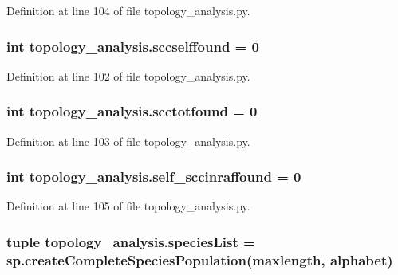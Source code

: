 Definition at line 104 of file topology\-\_\-analysis.\-py.

\hypertarget{a00128_aeacefe088f3283ea0e80ee31c0486d6d}{
\subsubsection[{sccselffound}]{\setlength{\rightskip}{0pt plus 5cm}int topology\-\_\-analysis.\-sccselffound = 0}}\label{a00128_aeacefe088f3283ea0e80ee31c0486d6d}


Definition at line 102 of file topology\-\_\-analysis.\-py.

\hypertarget{a00128_ac05c0aaedb357a42df2d5f3915bbedfa}{
\subsubsection[{scctotfound}]{\setlength{\rightskip}{0pt plus 5cm}int topology\-\_\-analysis.\-scctotfound = 0}}\label{a00128_ac05c0aaedb357a42df2d5f3915bbedfa}


Definition at line 103 of file topology\-\_\-analysis.\-py.

\hypertarget{a00128_a4d888d782ac3414961c2b844bed8b1bd}{
\subsubsection[{self\-\_\-sccinraffound}]{\setlength{\rightskip}{0pt plus 5cm}int topology\-\_\-analysis.\-self\-\_\-sccinraffound = 0}}\label{a00128_a4d888d782ac3414961c2b844bed8b1bd}


Definition at line 105 of file topology\-\_\-analysis.\-py.

\hypertarget{a00128_a5bfc4cfa78ac777159cb0ca9c9c5c2f6}{
\subsubsection[{species\-List}]{\setlength{\rightskip}{0pt plus 5cm}tuple topology\-\_\-analysis.\-species\-List = sp.\-create\-Complete\-Species\-Population(maxlength, {\bf alphabet})}}\label{a00128_a5bfc4cfa78ac777159cb0ca9c9c5c2f6}



